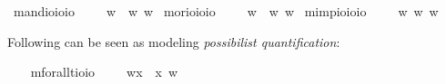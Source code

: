 \begin{isabellebody}
\isamarkupfalse%
\ mand{\isacharcolon}{\isacharcolon}{\isachardoublequoteopen}io{\isasymRightarrow}io{\isasymRightarrow}io{\isachardoublequoteclose}\ {\isacharparenleft}\ \ {\isachardoublequoteopen}{\isasymphi}\isactrlbold {\isasymand}{\isasympsi}\ {\isasymequiv}\ {\isasymlambda}w{\isachardot}\ {\isacharparenleft}{\isasymphi}\ w{\isacharparenright}{\isasymand}{\isacharparenleft}{\isasympsi}\ w{\isacharparenright}{\isachardoublequoteclose}\isanewline
{}\isamarkupfalse%
\ mor{\isacharcolon}{\isacharcolon}{\isachardoublequoteopen}io{\isasymRightarrow}io{\isasymRightarrow}io{\isachardoublequoteclose}\ {\isacharparenleft}\ \ {\isachardoublequoteopen}{\isasymphi}\isactrlbold {\isasymor}{\isasympsi}\ {\isasymequiv}\ {\isasymlambda}w{\isachardot}\ {\isacharparenleft}{\isasymphi}\ w{\isacharparenright}{\isasymor}{\isacharparenleft}{\isasympsi}\ w{\isacharparenright}{\isachardoublequoteclose}\isanewline
{}\isamarkupfalse%
\ mimp{\isacharcolon}{\isacharcolon}{\isachardoublequoteopen}io{\isasymRightarrow}io{\isasymRightarrow}io{\isachardoublequoteclose}\ {\isacharparenleft}\ \ {\isachardoublequoteopen}{\isasymphi}\isactrlbold {\isasymrightarrow}{\isasympsi}\ {\isasymequiv}\ {\isasymlambda}w{\isachardot}{\isacharparenleft}{\isasymphi}\ w{\isacharparenright}{\isasymlongrightarrow}{\isacharparenleft}{\isasympsi}\ w{\isacharparenright}{\isachardoublequoteclose}%
\begin{isamarkuptext}%
Following can be seen as modeling \emph{possibilist quantification}:%
\end{isamarkuptext}\isamarkuptrue%
\ \ \isamarkupfalse%
\ mforall{\isacharcolon}{\isacharcolon}{\isachardoublequoteopen}{\isacharparenleft}{\isacharprime}t{\isasymRightarrow}io{\isacharparenright}{\isasymRightarrow}io{\isachardoublequoteclose}\ {\isacharparenleft}{\isachardoublequoteopen}\isactrlbold {\isasymforall}{\isachardoublequoteclose}{\isacharparenright}\ \ {\isachardoublequoteopen}\isactrlbold {\isasymforall}{\isasymPhi}\ {\isasymequiv}\ {\isasymlambda}w{\isachardot}{\isasymforall}x{\isachardot}\ {\isacharparenleft}{\isasymPhi}\ x\ w{\isacharparenright}{\isachardoublequoteclose}\isanewline

\end{isabellebody}
